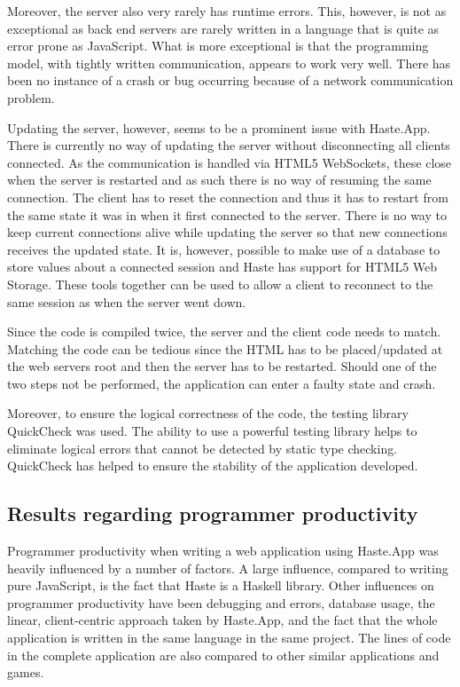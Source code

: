 \documentclass[a4paper]{article}
\begin{document}
Moreover, the server also very rarely has runtime errors. This, however, is not as exceptional as back end servers are rarely written in a language that is quite as error prone as JavaScript. What is more exceptional is that the programming model, with tightly written communication, appears to work very well. There has been no instance of a crash or bug occurring because of a network communication problem.

Updating the server, however, seems to be a prominent issue with Haste.App. There is currently no way of updating the server without disconnecting all clients connected. As the communication is handled via HTML5 WebSockets, these close when the server is restarted and as such there is no way of resuming the same connection. The client has to reset the connection and thus it has to restart from the same state it was in when it first connected to the server. There is no way to keep current connections alive while updating the server so that new connections receives the updated state. It is, however, possible to make use of a database to store values about a connected session and Haste has support for HTML5 Web Storage. These tools together can be used to allow a client to reconnect to the same session as when the server went down.

Since the code is compiled twice, the server and the client code needs to match. Matching the code can be tedious since the HTML has to be placed/updated at the web servers root and then the server has to be restarted. Should one of the two steps not be performed, the application can enter a faulty state and crash.

Moreover, to ensure the logical correctness of the code, the testing library QuickCheck was used. The ability to use a powerful testing library helps to eliminate logical errors that cannot be detected by static type checking. QuickCheck has helped to ensure the stability of the application developed.


\subsection{Results regarding programmer productivity}
\label{sub:programmer-productivity-results}
Programmer productivity when writing a web application using Haste.App was heavily influenced by a number of factors. A large influence, compared to writing pure JavaScript, is the fact that Haste is a Haskell library. Other influences on programmer productivity have been debugging and errors, database usage, the linear, client-centric approach taken by Haste.App, and the fact that the whole application is written in the same language in the same project. The lines of code in the complete application are also compared to other similar applications and games.
\end{document}

